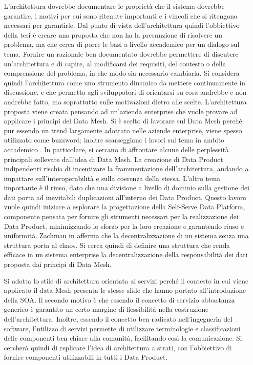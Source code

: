 \documentclass[12pt]{report}
\begin{document}
L'architettura dovrebbe documentare le proprietà che il sistema dovrebbe garantire, i motivi per cui sono ritenute importanti e i vincoli che si ritengono necessari per garantirle.
Dal punto di vista dell'architettura quindi l'obbiettivo della tesi è creare una proposta che non ha la presunzione di risolvere un problema, ma che cerca di porre le basi a livello accademico per un dialogo sul tema. 
Fornire un razionale ben documentato dovrebbe permettere di discutere un'architettura e di capire, al modificarsi dei requisiti, del contesto o della comprensione del problema, in che modo sia necessario cambiarla.
Si considera quindi l'architettura come uno strumento dinamico da mettere continuamente in discussione, e che permetta agli sviluppatori di orientarsi su cosa andrebbe e non andrebbe fatto, ma soprattutto sulle motivazioni dietro alle scelte.
L'architettura proposta viene creata pensando ad un'azienda enterprise che vuole provare ad applicare i principi del Data Mesh.
Si è scelto di lavorare sul Data Mesh perché pur essendo un trend largamente adottato nelle aziende enterprise, viene spesso utilizzato come buzzword; inoltre scarseggiano i lavori sul tema in ambito accademico \cite{goedegebuure2023data}.
In particolare, si cercano di affrontare alcune delle perplessità principali sollevate dall'idea di Data Mesh.
La creazione di Data Product indipendenti rischia di incentivare la frammentazione dell'architettura, andando a impattare sull'interoperabilità e sulla coerenza della stessa.
L'altro tema importante è il riuso, dato che una divisione a livello di dominio sulla gestione dei dati porta ad inevitabili duplicazioni all'interno dei Data Product.
Questo lavoro vuole quindi iniziare a esplorare la progettazione della Self-Serve Data Platform, componente pensata per fornire gli strumenti necessari per la realizzazione dei Data Product, minimizzando lo sforzo per la loro creazione e garantendo riuso e uniformità.
Zachman  in \cite{zachman1987framework} afferma che la decentralizzazione di un sistema senza una struttura porta al chaos. 
Si cerca quindi di definire una struttura che renda efficace in un sistema enterprise la decentralizzazione della responsabilità dei dati proposta dai principi di Data Mesh.

Si adotta lo stile di architettura orientata ai servizi perché il contesto in cui viene applicato il data Mesh presenta le stesse sfide che hanno portato all'introduzione della SOA. 
Il secondo motivo è che essendo il concetto di servizio abbastanza generico è garantito un certo margine di flessibilità nella costruzione dell'architettura.
Inoltre, essendo il concetto ben radicato nell'ingegneria del software, l'utilizzo di servizi permette di utilizzare terminologie e classificazioni delle componenti ben chiare alla comunità, facilitando così la comunicazione.
Si cercherà quindi di replicare l'idea di architettura a strati, con l'obbiettivo di fornire componenti utilizzabili in tutti i Data Product.
\end{document}
